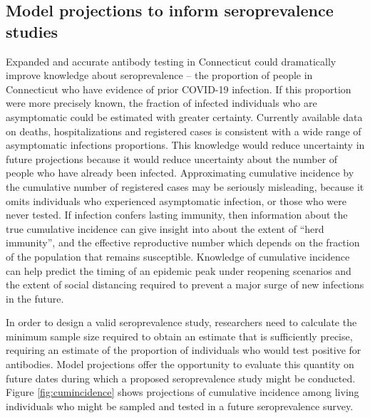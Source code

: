 \documentclass[11pt]{article}
\begin{document}
\subsection*{Model projections to inform seroprevalence studies}

Expanded and accurate antibody testing in Connecticut could dramatically improve knowledge about seroprevalence -- the proportion of people in Connecticut who have evidence of prior COVID-19 infection. If this proportion were more precisely known, the fraction of infected individuals who are asymptomatic could be estimated with greater certainty.  Currently available data on deaths, hospitalizations and registered cases is consistent with a wide range of asymptomatic infections proportions.  This knowledge would reduce uncertainty in future projections because it would reduce uncertainty about the number of people who have already been infected.  Approximating cumulative incidence by the cumulative number of registered cases may be seriously misleading, because it omits individuals who experienced asymptomatic infection, or those who were never tested.  If infection confers lasting immunity, then information about the true cumulative incidence can give insight into about the extent of ``herd immunity'', and the effective reproductive number which depends on the fraction of the population that remains susceptible. Knowledge of cumulative incidence can help predict the timing of an epidemic peak under reopening scenarios and the extent of social distancing required to prevent a major surge of new infections in the future. 

In order to design a valid seroprevalence study, researchers need to calculate the minimum sample size required to obtain an estimate that is sufficiently precise, requiring an estimate of the proportion of individuals who would test positive for antibodies.  Model projections offer the opportunity to evaluate this quantity on future dates during which a proposed seroprevalence study might be conducted.  Figure \ref{fig:cumincidence} shows projections of cumulative incidence among living individuals who might be sampled and tested in a future seroprevalence survey. 
\end{document}

